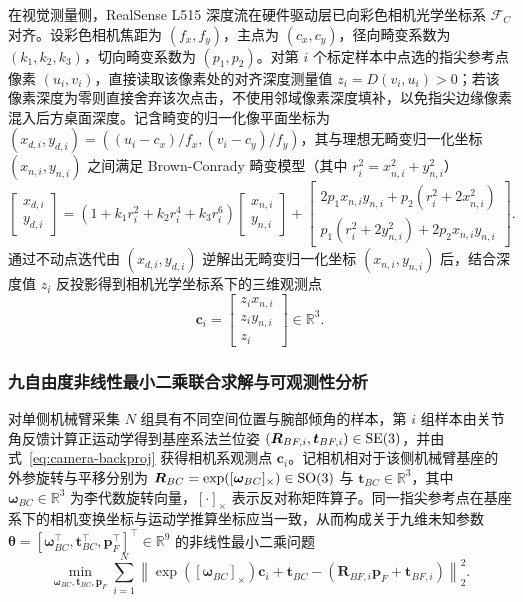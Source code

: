 在视觉测量侧，RealSense L515 深度流在硬件驱动层已向彩色相机光学坐标系 $\mathcal{F}_C$ 对齐。设彩色相机焦距为 $(f_x, f_y)$，主点为 $(c_x, c_y)$，径向畸变系数为 $(k_1, k_2, k_3)$，切向畸变系数为 $(p_1, p_2)$。对第 $i$ 个标定样本中点选的指尖参考点像素 $(u_i, v_i)$，直接读取该像素处的对齐深度测量值 $z_i = D(v_i, u_i) > 0$；若该像素深度为零则直接舍弃该次点击，不使用邻域像素深度填补，以免指尖边缘像素混入后方桌面深度。记含畸变的归一化像平面坐标为 $(x_{d,i}, y_{d,i}) = ((u_i - c_x)/f_x, (v_i - c_y)/f_y)$，其与理想无畸变归一化坐标 $(x_{n,i}, y_{n,i})$ 之间满足 Brown-Conrady 畸变模型（其中 $r_i^2 = x_{n,i}^2 + y_{n,i}^2$）
\begin{equation}
  \begin{bmatrix} x_{d,i} \\ y_{d,i} \end{bmatrix}
  = \left(1 + k_1 r_i^2 + k_2 r_i^4 + k_3 r_i^6\right)\begin{bmatrix} x_{n,i} \\ y_{n,i} \end{bmatrix}
  + \begin{bmatrix} 2p_1 x_{n,i} y_{n,i} + p_2(r_i^2 + 2x_{n,i}^2) \\ p_1(r_i^2 + 2y_{n,i}^2) + 2p_2 x_{n,i} y_{n,i} \end{bmatrix}.
  \label{eq:brown-conrady}
\end{equation}
通过不动点迭代由 $(x_{d,i}, y_{d,i})$ 逆解出无畸变归一化坐标 $(x_{n,i}, y_{n,i})$ 后，结合深度值 $z_i$ 反投影得到相机光学坐标系下的三维观测点
\begin{equation}
  \bm{c}_i = \begin{bmatrix} z_i x_{n,i} \\ z_i y_{n,i} \\ z_i \end{bmatrix} \in \mathbb{R}^3.
  \label{eq:camera-backproj}
\end{equation}

\subsubsection{九自由度非线性最小二乘联合求解与可观测性分析}

对单侧机械臂采集 $N$ 组具有不同空间位置与腕部倾角的样本，第 $i$ 组样本由关节角反馈计算正运动学得到基座系法兰位姿 $(\bm{R}_{BF,i}, \bm{t}_{BF,i}) \in \mathrm{SE}(3)$，并由式~\eqref{eq:camera-backproj} 获得相机系观测点 $\bm{c}_i$。记相机相对于该侧机械臂基座的外参旋转与平移分别为 $\bm{R}_{BC} = \exp([\bm{\omega}_{BC}]_{\times}) \in \mathrm{SO}(3)$ 与 $\bm{t}_{BC} \in \mathbb{R}^3$，其中 $\bm{\omega}_{BC} \in \mathbb{R}^3$ 为李代数旋转向量，$[\cdot]_{\times}$ 表示反对称矩阵算子。同一指尖参考点在基座系下的相机变换坐标与运动学推算坐标应当一致，从而构成关于九维未知参数 $\bm{\theta} = [\bm{\omega}_{BC}^{\top}, \bm{t}_{BC}^{\top}, \bm{p}_F^{\top}]^{\top} \in \mathbb{R}^9$ 的非线性最小二乘问题
\begin{equation}
  \min_{\bm{\omega}_{BC}, \bm{t}_{BC}, \bm{p}_F} \sum_{i=1}^{N} \left\| \exp([\bm{\omega}_{BC}]_{\times})\bm{c}_i + \bm{t}_{BC} - \left(\bm{R}_{BF,i}\bm{p}_F + \bm{t}_{BF,i}\right) \right\|_2^2.
  \label{eq:calib-nls}
\end{equation}

